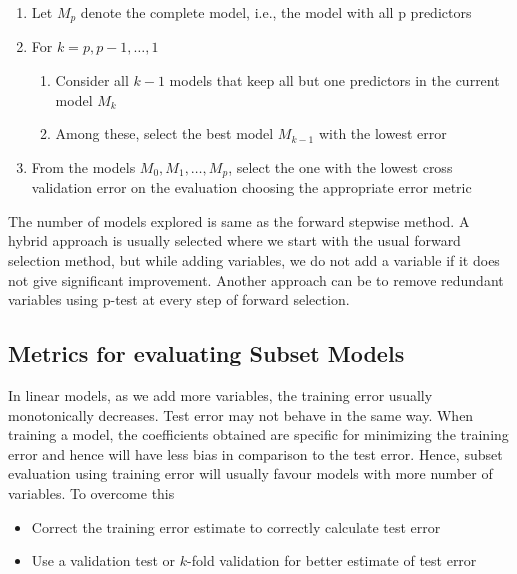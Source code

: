 \documentclass[11pt, a4paper]{article}
\begin{document}
    \begin{enumerate}
        \item Let $M_{p}$ denote the complete model, i.e., the model with all p predictors
        \item For $k = p, p-1, \ldots, 1$
        \begin{enumerate}
            \item Consider all $k-1$ models that keep all but one predictors in the current model $M_{k}$
            \item Among these, select the best model $M_{k-1}$ with the lowest error
        \end{enumerate}
        \item From the models $M_{0}, M_{1}, \ldots, M_{p}$, select the one with the lowest cross validation error on the evaluation choosing the appropriate error metric 
    \end{enumerate}

    The number of models explored is same as the forward stepwise method.\newline
    A hybrid approach is usually selected where we start with the usual forward selection method, but while adding variables, we do not add a variable if it does not give significant improvement. Another approach can be to remove redundant variables using p-test at every step of forward selection.

    
    \subsection{Metrics for evaluating Subset Models}
    In linear models, as we add more variables, the training error usually monotonically decreases. Test error may not behave in the same way. When training a model, the coefficients obtained are specific for minimizing the training error and hence will have less bias in comparison to the test error. \newline
    Hence, subset evaluation using training error will usually favour models with more number of variables. To overcome this
    \begin{itemize}
        \item Correct the training error estimate to correctly calculate test error
        \item Use a validation test or $k$-fold validation for better estimate of test error
    \end{itemize}
    
\end{document}
